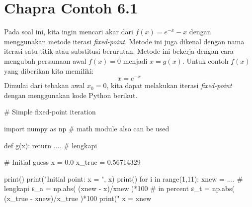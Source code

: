 \section{Chapra Contoh 6.1}

Pada soal ini, kita ingin mencari akar dari $f(x) = e^{-x} - x$ dengan
menggunakan metode iterasi \textit{fixed-point}. Metode ini juga dikenal
dengan nama iterasi satu titik atau substitusi berurutan. Metode ini
bekerja dengan cara mengubah persamaan awal $f(x) = 0$ menjadi
$x = g(x)$. Untuk contoh $f(x)$ yang diberikan kita memiliki:
\begin{equation*}
x = e^{-x}
\end{equation*}
Dimulai dari tebakan awal $x_{0} = 0$, kita dapat melakukan iterasi
\textit{fixed-point} dengan menggunakan kode Python berikut.

\begin{pythoncode}
# Simple fixed-point iteration
    
import numpy as np # math module also can be used
    
def g(x):
    return .... # lengkapi
    
# Initial guess
x = 0.0
x_true = 0.56714329
    
print()
print("Initial point: x = ", x)
print()
for i in range(1,11):
    xnew = .... # lengkapi
    ε_a = np.abs( (xnew - x)/xnew )*100 # in percent
    ε_t = np.abs( (x_true - xnew)/x_true )*100
    print("%
    x = xnew    
\end{pythoncode}
